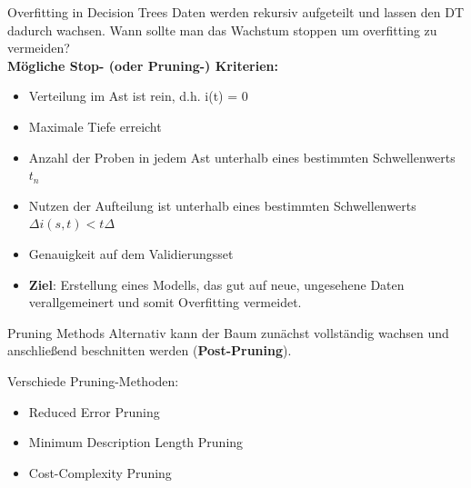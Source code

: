 \documentclass{beamer}
\begin{document}
\begin{frame}{Overfitting in Decision Trees}
Daten werden rekursiv aufgeteilt und lassen den DT dadurch wachsen. Wann sollte man das Wachstum stoppen um overfitting zu vermeiden?\\
\textbf{Mögliche Stop- (oder Pruning-) Kriterien:}
\begin{itemize}
\item Verteilung im Ast ist rein, d.h. i(t) = 0
\item Maximale Tiefe erreicht
\item Anzahl der Proben in jedem Ast unterhalb eines bestimmten Schwellenwerts $t_n$
\item Nutzen der Aufteilung ist unterhalb eines bestimmten Schwellenwerts $\Delta i(s,t) < t\Delta$
\item Genauigkeit auf dem Validierungsset
\item {\textbf{Ziel}: Erstellung eines Modells, das gut auf neue, ungesehene Daten verallgemeinert und somit Overfitting vermeidet.}
\end{itemize}
\end{frame}

\begin{frame}{Pruning Methods}
Alternativ kann der Baum zunächst vollständig wachsen und anschließend beschnitten werden (\textbf{Post-Pruning}).
 \begin{alertblock}{Verschiede Pruning-Methoden:}
\begin{itemize}
\item Reduced Error Pruning
\item Minimum Description Length Pruning
\item Cost-Complexity Pruning

\end{itemize}

\end{alertblock}
\end{frame}
\end{document}

